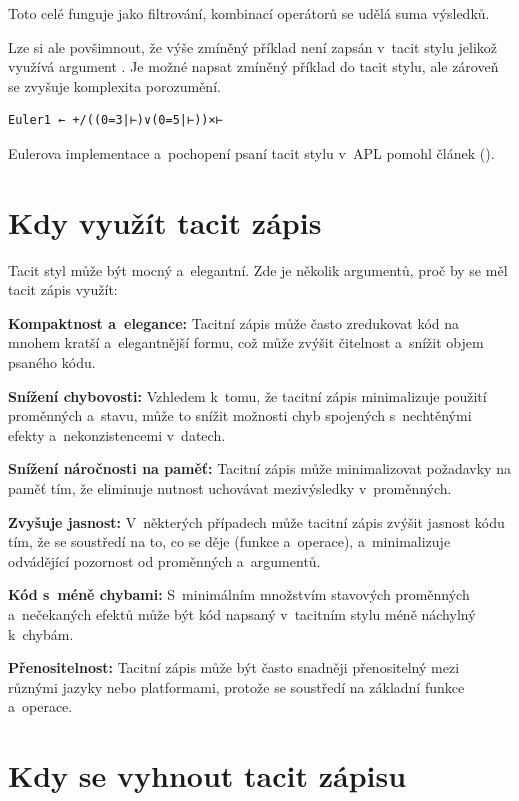 \documentclass[male, czech]{kithesis}
\newcommand{\aplInline}[1]{\colorbox{gray!10}{{\apl{#1}}}}
\begin{document}
Toto celé funguje jako filtrování, 
kombinací operátorů \aplInline{+/} se udělá suma výsledků.

Lze si ale povšimnout, 
že výše zmíněný příklad není zapsán v~tacit stylu jelikož využívá argument \aplInline{⍵}.
Je možné napsat zmíněný příklad do tacit stylu, 
ale zároveň se zvyšuje komplexita porozumění.
\begin{lstlisting}[language=apl,extendedchars=true]
  Euler1 ← +/((0=3|⊢)∨(0=5|⊢))×⊢
\end{lstlisting}

Eulerova implementace a~pochopení psaní tacit stylu v~APL pomohl článek (\cite{CzechApl}).

\section{Kdy využít tacit zápis}

Tacit styl může být mocný a~elegantní.
Zde je několik argumentů, 
proč by se měl tacit zápis využít:

\textbf{Kompaktnost a~elegance:}
Tacitní zápis může často zredukovat kód na mnohem kratší a~elegantnější formu, 
což může zvýšit čitelnost a~snížit objem psaného kódu.

\textbf{Snížení chybovosti:}
Vzhledem k~tomu, že tacitní zápis minimalizuje použití proměnných a~stavu, 
může to snížit možnosti chyb spojených s~nechtěnými efekty a~nekonzistencemi v~datech.

\textbf{Snížení náročnosti na paměť:}
Tacitní zápis může minimalizovat požadavky na paměť tím, 
že eliminuje nutnost uchovávat mezivýsledky v~proměnných.

\textbf{Zvyšuje jasnost:}
V~některých případech může tacitní zápis zvýšit jasnost kódu tím, 
že se soustředí na to, co se děje (funkce a~operace), 
a~minimalizuje odvádějící pozornost od proměnných a~argumentů.

\textbf{Kód s~méně chybami:}
S~minimálním množstvím stavových proměnných
a~nečekaných efektů může být kód napsaný v~tacitním stylu méně náchylný k~chybám.

\textbf{Přenositelnost:}
Tacitní zápis může být často snadněji přenositelný mezi různými jazyky nebo platformami, 
protože se soustředí na základní funkce a~operace.


\section{Kdy se vyhnout tacit zápisu}
\end{document}
